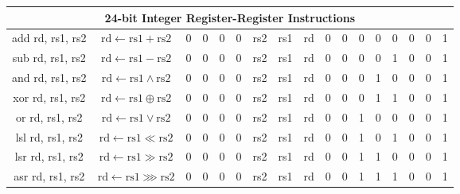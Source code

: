 \documentclass[a4paper,10pt]{article}
\begin{document}
\begin{landscape}
\begin{longtable}[c]{|c|c|@{}c@{}|@{}c@{}|@{}c@{}|@{}c@{}|@{}c@{}|@{}c@{}|@{}c@{}|@{}c@{}|@{}c@{}|@{}c@{}|@{}c@{}|@{}c@{}|@{}c@{}|@{}c@{}|@{}c@{}|@{}c@{}|@{}c@{}|@{}c@{}|@{}c@{}|@{}c@{}|@{}c@{}|@{}c@{}|@{}c@{}|@{}c@{}|}
\hline
\multicolumn{26}{|c|}{24-bit Integer Register-Register Instructions}                                                                                                                                                                                                                                                             \\\hline
add rd, rs1, rs2      & $\mathrm{rd} \leftarrow \mathrm{rs1} + \mathrm{rs2}$ & 0 & 0 & 0 & 0 & \multicolumn{4}{c|}{rs2}            & \multicolumn{4}{c|}{rs1}            & \multicolumn{4}{c|}{rd}      & 0              & 0                & 0   & 0   & 0   & 0 & 0 & 1 \\
sub rd, rs1, rs2      & $\mathrm{rd} \leftarrow \mathrm{rs1} - \mathrm{rs2}$ & 0 & 0 & 0 & 0 & \multicolumn{4}{c|}{rs2}            & \multicolumn{4}{c|}{rs1}            & \multicolumn{4}{c|}{rd}      & 0              & 0                & 0   & 0   & 1   & 0 & 0 & 1 \\
and rd, rs1, rs2      & $\mathrm{rd} \leftarrow \mathrm{rs1} \land \mathrm{rs2}$ & 0 & 0 & 0 & 0 & \multicolumn{4}{c|}{rs2}            & \multicolumn{4}{c|}{rs1}            & \multicolumn{4}{c|}{rd}      & 0              & 0                & 0   & 1   & 0   & 0 & 0 & 1 \\
xor rd, rs1, rs2      & $\mathrm{rd} \leftarrow \mathrm{rs1} \oplus \mathrm{rs2}$ & 0 & 0 & 0 & 0 & \multicolumn{4}{c|}{rs2}            & \multicolumn{4}{c|}{rs1}            & \multicolumn{4}{c|}{rd}      & 0              & 0                & 0   & 1   & 1   & 0 & 0 & 1 \\
or rd, rs1, rs2       & $\mathrm{rd} \leftarrow \mathrm{rs1} \lor \mathrm{rs2}$ & 0 & 0 & 0 & 0 & \multicolumn{4}{c|}{rs2}            & \multicolumn{4}{c|}{rs1}            & \multicolumn{4}{c|}{rd}      & 0              & 0                & 1   & 0   & 0   & 0 & 0 & 1 \\
lsl rd, rs1, rs2      & $\mathrm{rd} \leftarrow \mathrm{rs1} \ll \mathrm{rs2}$ & 0 & 0 & 0 & 0 & \multicolumn{4}{c|}{rs2}            & \multicolumn{4}{c|}{rs1}            & \multicolumn{4}{c|}{rd}      & 0              & 0                & 1   & 0   & 1   & 0 & 0 & 1 \\
lsr rd, rs1, rs2      & $\mathrm{rd} \leftarrow \mathrm{rs1} \gg \mathrm{rs2}$ & 0 & 0 & 0 & 0 & \multicolumn{4}{c|}{rs2}            & \multicolumn{4}{c|}{rs1}            & \multicolumn{4}{c|}{rd}      & 0              & 0                & 1   & 1   & 0   & 0 & 0 & 1 \\
asr rd, rs1, rs2      & $\mathrm{rd} \leftarrow \mathrm{rs1} \ggg \mathrm{rs2}$ & 0 & 0 & 0 & 0 & \multicolumn{4}{c|}{rs2}            & \multicolumn{4}{c|}{rs1}            & \multicolumn{4}{c|}{rd}      & 0              & 0                & 1   & 1   & 1   & 0 & 0 & 1 \\


\end{longtable}
\end{landscape}
\end{document}
